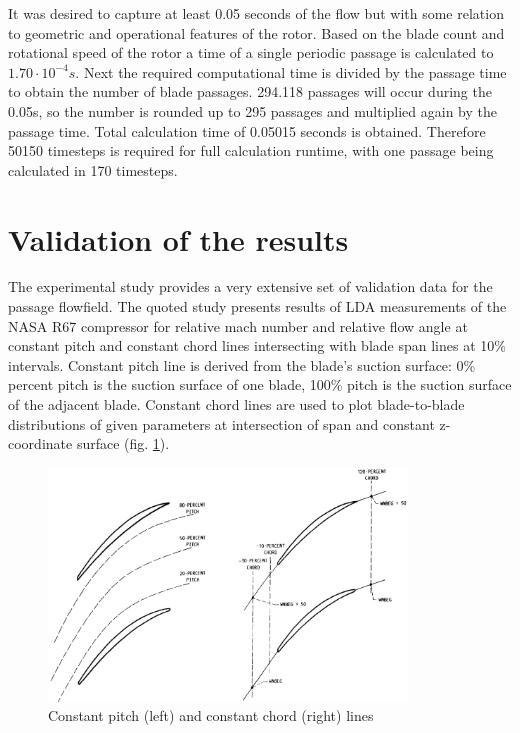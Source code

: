 It was desired to capture at least 0.05 seconds of the flow but with some relation to geometric and operational features of the rotor. Based on the blade count and rotational speed of the rotor a time of a single periodic passage is calculated to $1.70 \cdot 10^{-4}s$. Next the required computational time is divided by the passage time to obtain the number of blade passages. 294.118 passages will occur during the 0.05s, so the number is rounded up to 295 passages and multiplied again by the passage time. Total calculation time of 0.05015 seconds is obtained. Therefore 50150 timesteps is required for full calculation runtime, with one passage being calculated in 170 timesteps.

\section{Validation of the results}
The experimental study \citep{r67laser} provides a very extensive set of validation data for the passage flowfield. The quoted study presents results of LDA measurements of the NASA R67 compressor for relative mach number and relative flow angle at constant pitch and constant chord lines intersecting with blade span lines at 10\% intervals. Constant pitch line is derived from the blade's suction surface: 0\% percent pitch is the suction surface of one blade, 100\% pitch is the suction surface of the adjacent blade. Constant chord lines are used to plot blade-to-blade distributions of given parameters at intersection of span and constant z-coordinate surface (fig. \ref{fig_LA}).

\begin{figure}[h!]
\centering %
\includegraphics[width=0.85\textwidth]{Pictures/LA.png}
\caption{Constant pitch (left) and constant chord (right) lines \citep{r67laser}}
\label{fig_LA}
\end{figure}

